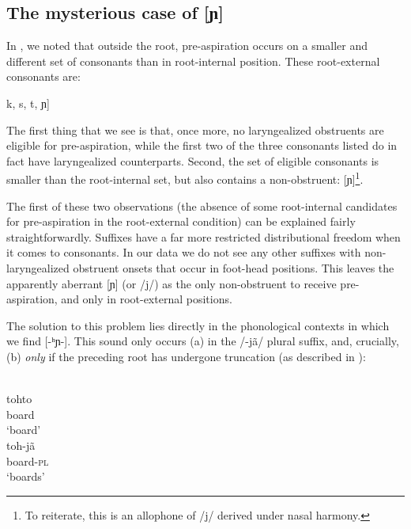 \documentclass[output=paper]{langscibook}
\begin{document}
\subsection{The mysterious case of [ɲ]}\label{sec-palnas}
In , we noted that outside the root, pre-aspiration occurs on a smaller and different set of consonants than in root-internal position. These root-external consonants are:

\begin{exe}\label{exe-ana-preClist-ext}
	\ex {[}k, s, t, ɲ]
\end{exe}

The first thing that we see is that, once more, no laryngealized obstruents are eligible for pre-aspiration, while the first two of the three consonants listed do in fact have laryngealized counterparts. Second, the set of eligible consonants is smaller than the root-internal set, but also contains a non-obstruent: [ɲ]\footnote{To reiterate, this is an allophone of /j/ derived under nasal harmony.}.

\begin{sloppypar}
The first of these two observations (the absence of some root-internal candidates for pre-aspiration in the root-external condition) can be explained fairly straightforwardly. Suffixes have a far more restricted distributional freedom when it comes to consonants. In our data we do not see any other suffixes with non-laryngealized obstruent onsets that occur in foot-head positions. This leaves the apparently aberrant [ɲ] (or /j/) as the only non-obstruent to receive pre-aspiration, and only in root-external positions.
\end{sloppypar}

The solution to this problem lies directly in the phonological contexts in which we find [-ʰɲ-]. This sound only occurs (a) in the /-jã/ plural suffix, and, crucially, (b) \emph{only} if the preceding root has undergone truncation (as described in \citealt[105]{Bruil:2014}):

\begin{exe}
\ex
\begin{xlist}
\ex
\glll [to.ʰto] \\
tohto\\
board\\
\trans `board'
\ex
\glll [to.ʰɲã] \\
toh-jã \\
board-\textsc{pl}\\
\trans `boards'
\end{xlist}
\end{exe}
\end{document}
